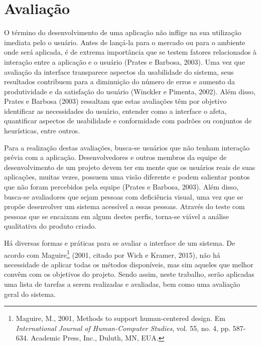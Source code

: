 \chapter{\label{chap:avaliacao}Avaliação}

\color{blue}
O término do desenvolvimento de uma aplicação não inflige na sua utilização imediata pelo o usuário. Antes de lançá-la para o mercado ou para o ambiente onde será aplicada, é de extrema importância que se testem fatores relacionados à interação entre a aplicação e o usuário (Prates e Barbosa, 2003). Uma vez que avaliação da interface transparece aspectos da usabilidade do sistema, seus resultados contribuem para a diminuição do número de erros e aumento da produtividade e da satisfação do usuário (Winckler e Pimenta, 2002)\nocite{WINCKLER2002}. Além disso, Prates e Barbosa (2003) ressaltam que estas avaliações têm por objetivo identificar as necessidades do usuário, entender como a interface o afeta, quantificar aspectos de usabilidade e conformidade com padrões ou conjuntos de heurísticas, entre outros.

Para a realização destas avaliações, busca-se usuários que não tenham interação prévia com a aplicação. Desenvolvedores e outros membros da equipe de desenvolvimento de um projeto devem ter em mente que os usuários reais de suas aplicações, muitas vezes, possuem uma visão diferente e podem salientar pontos que não foram percebidos pela equipe (Prates e Barbosa, 2003). Além disso, busca-se avaliadores que sejam pessoas com deficiência visual, uma vez que se propõe desenvolver um sistema acessível a essas pessoas. Através do teste com pessoas que se encaixam em algum destes perfis, torna-se viável a análise qualitativa do produto criado.

Há diversas formas e práticas para se avaliar a interface de um sistema. De acordo com Maguire\footnote{Maguire, M., 2001, Methods to support human-centered design. Em \emph{International Journal of Human-Computer Studies}, vol. 55, no. 4, pp. 587-634. Academic Press, Inc., Duluth, MN, EUA.} (2001, citado por Wich e Kramer, 2015\nocite{WICH2015}), não há necessidade de aplicar todas os métodos disponíveis, mas sim aqueles que melhor convêm com os objetivos do projeto. Sendo assim, neste trabalho, serão aplicadas uma lista de tarefas a serem realizadas e avaliadas, bem como uma avaliação geral do sistema.

